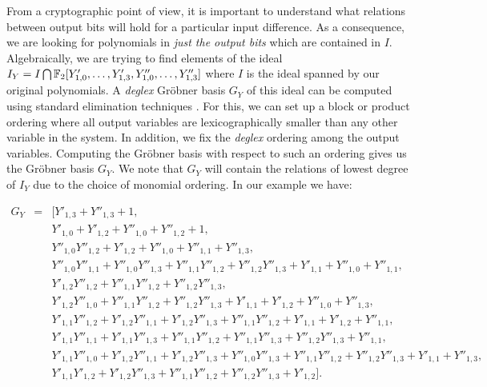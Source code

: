 From a cryptographic point of view, it is important to understand what relations between output bits will hold for a particular  input difference. As a consequence, we are looking for polynomials in \emph{just the output bits} which are contained in \(I\).  Algebraically, we are trying to find elements of the ideal 
$
I_Y = I \bigcap \mathbb{F}_2[Y'_{1,0},\dots,Y'_{1,3},Y''_{1,0},\dots,Y''_{1,3}]
$
where \(I\) is the ideal spanned by our original polynomials. A \emph{deglex} Gr\"obner basis $G_Y$ of this ideal can be computed using standard elimination techniques \cite[p.168]{Becker1991}. For this, we can set up a block or product ordering where all output variables are lexicographically smaller than any other variable in the system. In addition, we fix the \emph{deglex} ordering among the output variables. Computing the Gröbner basis with respect to such an ordering gives us the Gröbner basis $G_Y$. We note that $G_Y$ will contain the relations of lowest degree of $I_Y$ due to the choice of monomial ordering. In our example we have: 

\begin{eqnarray*}
    G_Y &=& [ Y'_{1,3} + Y''_{1,3} + 1,\\
&& Y'_{1,0} + Y'_{1,2} + Y''_{1,0} + Y''_{1,2} + 1,\\
&& Y''_{1,0} Y''_{1,2} + Y'_{1,2} + Y''_{1,0} + Y''_{1,1} + Y''_{1,3},\\
&& Y''_{1,0} Y''_{1,1} + Y''_{1,0} Y''_{1,3} + Y''_{1,1} Y''_{1,2} + Y''_{1,2} Y''_{1,3} + Y'_{1,1} + Y''_{1,0} + Y''_{1,1},\\
&& Y'_{1,2} Y''_{1,2} + Y''_{1,1} Y''_{1,2} + Y''_{1,2} Y''_{1,3},\\
&& Y'_{1,2} Y''_{1,0} + Y''_{1,1} Y''_{1,2} + Y''_{1,2} Y''_{1,3} + Y'_{1,1} + Y'_{1,2} + Y''_{1,0} + Y''_{1,3},\\
&& Y'_{1,1} Y''_{1,2} + Y'_{1,2} Y''_{1,1} + Y'_{1,2} Y''_{1,3} + Y''_{1,1} Y''_{1,2} + Y'_{1,1} + Y'_{1,2} + Y''_{1,1},\\
&& Y'_{1,1} Y''_{1,1} + Y'_{1,1} Y''_{1,3} + Y''_{1,1} Y''_{1,2} + Y''_{1,1} Y''_{1,3} + Y''_{1,2} Y''_{1,3} + Y''_{1,1},\\
&& Y'_{1,1} Y''_{1,0} + Y'_{1,2} Y''_{1,1} + Y'_{1,2} Y''_{1,3} + Y''_{1,0} Y''_{1,3} + Y''_{1,1} Y''_{1,2} + Y''_{1,2} Y''_{1,3} + Y'_{1,1} + Y''_{1,3},\\
&& Y'_{1,1} Y'_{1,2} + Y'_{1,2} Y''_{1,3} + Y''_{1,1} Y''_{1,2} + Y''_{1,2} Y''_{1,3} + Y'_{1,2}].\\
\end{eqnarray*}

